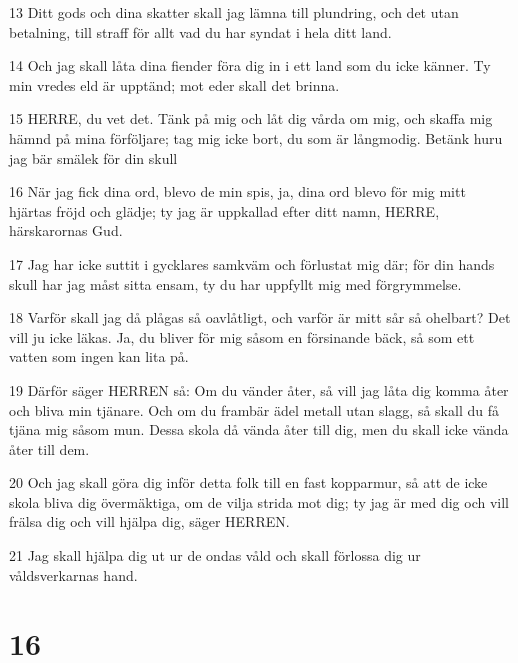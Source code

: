 \par 13 Ditt gods och dina skatter skall jag lämna till plundring, och det utan betalning, till straff för allt vad du har syndat i hela ditt land.
\par 14 Och jag skall låta dina fiender föra dig in i ett land som du icke känner. Ty min vredes eld är upptänd; mot eder skall det brinna.
\par 15 HERRE, du vet det. Tänk på mig och låt dig vårda om mig, och skaffa mig hämnd på mina förföljare; tag mig icke bort, du som är långmodig. Betänk huru jag bär smälek för din skull
\par 16 När jag fick dina ord, blevo de min spis, ja, dina ord blevo för mig mitt hjärtas fröjd och glädje; ty jag är uppkallad efter ditt namn, HERRE, härskarornas Gud.
\par 17 Jag har icke suttit i gycklares samkväm och förlustat mig där; för din hands skull har jag måst sitta ensam, ty du har uppfyllt mig med förgrymmelse.
\par 18 Varför skall jag då plågas så oavlåtligt, och varför är mitt sår så ohelbart? Det vill ju icke läkas. Ja, du bliver för mig såsom en försinande bäck, så som ett vatten som ingen kan lita på.
\par 19 Därför säger HERREN så: Om du vänder åter, så vill jag låta dig komma åter och bliva min tjänare. Och om du frambär ädel metall utan slagg, så skall du få tjäna mig såsom mun. Dessa skola då vända åter till dig, men du skall icke vända åter till dem.
\par 20 Och jag skall göra dig inför detta folk till en fast kopparmur, så att de icke skola bliva dig övermäktiga, om de vilja strida mot dig; ty jag är med dig och vill frälsa dig och vill hjälpa dig, säger HERREN.
\par 21 Jag skall hjälpa dig ut ur de ondas våld och skall förlossa dig ur våldsverkarnas hand.

\chapter{16}

